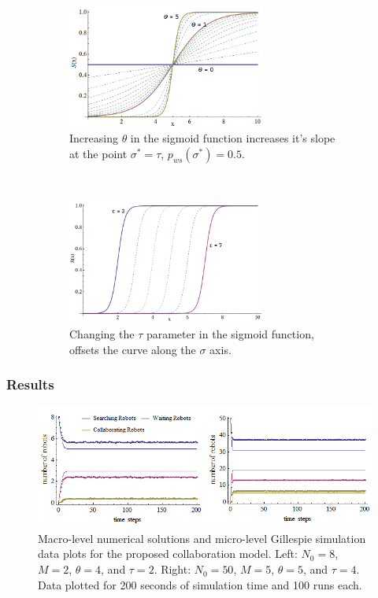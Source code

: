 \documentclass[Main.tex]{subfiles}
\begin{document}
\begin{figure}[!htb]
\centering\begin{subfigure}{.5\textwidth}
\centering\includegraphics[width=6.5cm]{assets/sigmoid1.png}
\caption{Increasing $\theta$ in the sigmoid function increases it's slope at the point $\sigma^* = \tau$, $p_{ws}(\sigma^*) = 0.5$.}
\end{subfigure}~
\centering\begin{subfigure}{.5\textwidth}
\centering\includegraphics[width=6.5cm]{assets/sigmoid2.png}
\caption{Changing the $\tau$ parameter in the sigmoid function, offsets the curve along the $\sigma$ axis.}
\end{subfigure}
\caption{}\label{fig:sig}
\end{figure}

\subsubsection*{Results}
\begin{figure}[!ht]
\centering\includegraphics[width=\textwidth]{assets/macmic.png}
\caption{Macro-level numerical solutions and micro-level Gillespie simulation data plots for the proposed collaboration model. Left: $N_0 = 8$, $M = 2$, $\theta = 4$, and $\tau = 2$. Right: $N_0 = 50$, $M = 5$, $\theta = 5$, and $\tau = 4$. Data plotted for 200 seconds of simulation time and 100 runs each.}\label{fig:macmic}
\end{figure}
\end{document}
